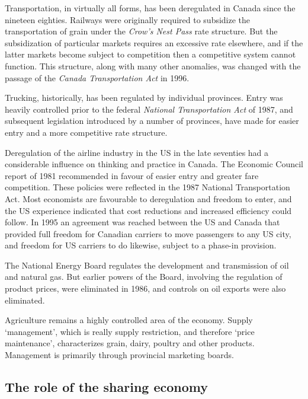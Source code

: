 Transportation, in virtually all forms, has been deregulated in Canada since
the nineteen eighties. Railways were originally required to subsidize the
transportation of grain under the \textit{Crow's Nest Pass} rate structure.
But the subsidization of particular markets requires an excessive rate
elsewhere, and if the latter markets become subject to competition then a
competitive system cannot function. This structure, along with many other
anomalies, was changed with the passage of the \textit{Canada Transportation
	Act} in 1996.

Trucking, historically, has been regulated by individual provinces. Entry
was heavily controlled prior to the federal \textit{National Transportation
	Act} of 1987, and subsequent legislation introduced by a number of
provinces, have made for easier entry and a more competitive rate structure.

Deregulation of the airline industry in the US in the late seventies had a
considerable influence on thinking and practice in Canada. The Economic
Council report of 1981 recommended in favour of easier entry and greater
fare competition. These policies were reflected in the 1987 National
Transportation Act. Most economists are favourable to deregulation and
freedom to enter, and the US experience indicated that cost reductions and
increased efficiency could follow. In 1995 an agreement was reached between
the US and Canada that provided full freedom for Canadian carriers to move
passengers to any US city, and freedom for US carriers to do likewise,
subject to a phase-in provision.

The National Energy Board regulates the development and transmission of oil
and natural gas. But earlier powers of the Board, involving the regulation
of product prices, were eliminated in 1986, and controls on oil exports were
also eliminated.

Agriculture remains a highly controlled area of the economy. Supply
`management', which is really supply restriction, and therefore `price
maintenance', characterizes grain, dairy, poultry and other products.
Management is primarily through provincial marketing boards.

\newhtmlpage

\subsection*{The role of the sharing economy}

